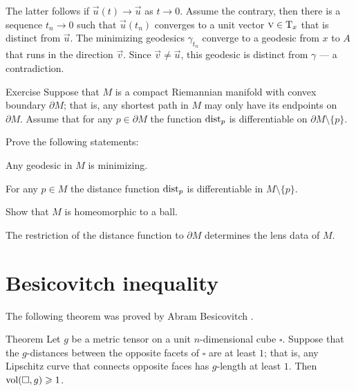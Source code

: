 The latter follows if $\vec u(t)\to \vec u$ as $t\to 0$.
Assume the contrary, then there is a sequence $t_n\to 0$ such that $\vec u(t_n)$ converges to a
unit vector $\textsc v\in \operatorname{\rm T}_x$ that is distinct from $\vec u$.
The minimizing geodesics $\gamma_{t_n}$ converge to a geodesic from $x$ to $A$ that runs in the direction $\vec v$.
Since $\vec v\ne \vec u$,
this geodesic is distinct from $\gamma$ --- a contradiction.
\qeds

\begin{thm}{Exercise}\label{ex:simple-mnfld}
Suppose that $M$ is a compact Riemannian manifold with convex boundary $\partial M$;
that is, any shortest path in $M$ may only have its endpoints on $\partial M$.
Assume that for any $p\in \partial M$ the function $\mathrm{dist}_p$ is differentiable on $\partial M\setminus\{p\}$.

Prove the following statements:

\begin{subthm}{}
Any geodesic in $M$ is minimizing.
\end{subthm}

\begin{subthm}{}
For any $p\in M$ the distance function $\mathrm{dist}_p$ is differentiable in $M\setminus\{p\}$.
\end{subthm}

\begin{subthm}{}
Show that $M$ is homeomorphic to a ball.
\end{subthm}

\begin{subthm}{}
The restriction of the distance function to $\partial M$ determines the lens data of $M$.
\end{subthm}


\end{thm}





\section{Besicovitch inequality}

The following theorem was proved by Abram Besicovitch \cite{besicovitch}.

\begin{thm}{Theorem}\label{thm:besikovitch}
Let $g$ be a metric tensor on a unit $n$-dimensional cube $\square$.
Suppose that the $g$-distances between the opposite facets of $\square$ are at least $1$; that is, any Lipschitz curve that connects opposite faces has $g$-length at least $1$.
Then $\operatorname{\rm vol}\nolimits(\square, g)\geqslant 1$.
\end{thm}

